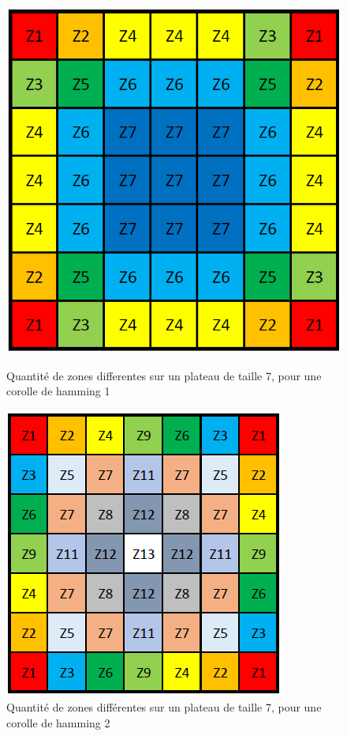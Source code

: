 	\begin{figure}[H]
		\begin{minipage}{0.49\textwidth}
			\includegraphics[width=\linewidth]{images/corolle_zones_h_1.png}
			\caption{Quantité de zones differentes sur un plateau de taille 7, pour une corolle de hamming 1}\label{fig:corolle_zones_h_1}
		\end{minipage}\hfill
		\begin{minipage}{0.49\textwidth}
			\includegraphics[width=\linewidth]{images/corolle_zones_h_2.png}
			\caption{Quantité de zones différentes sur un plateau de taille 7, pour une corolle de hamming 2}\label{fig:corolle_zones_h_2}
		\end{minipage}\hfill
	\end{figure}
	
